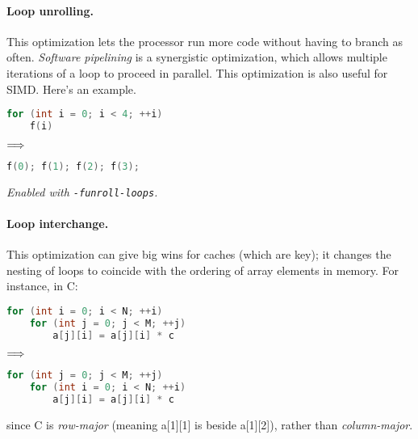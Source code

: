 \paragraph{Loop unrolling.} This optimization
lets the processor run more code without having to branch
as often. \emph{Software pipelining} is a synergistic optimization,
which allows multiple iterations of a loop to proceed in parallel.
This optimization is also useful for SIMD. Here's an example.
\begin{center}
\vspace*{-1em}
\begin{minipage}{.3\textwidth}
  \begin{lstlisting}[language=C]
for (int i = 0; i < 4; ++i)
    f(i)
  \end{lstlisting}
  \end{minipage} $\Longrightarrow \hspace*{2em}$ \begin{minipage}{.4\textwidth}
  \begin{lstlisting}[language=C]
f(0); f(1); f(2); f(3);
  \end{lstlisting}
  \end{minipage}
  \end{center}
\noindent \emph{Enabled with {\tt -funroll-loops}.}

\paragraph{Loop interchange.} This optimization can give big wins
for caches (which are key); it changes the nesting of loops to
coincide with the ordering of array elements in memory. For instance,
in C:
\begin{center}
\vspace*{-1em}
\begin{minipage}{.3\textwidth}
  \begin{lstlisting}[language=C]
for (int i = 0; i < N; ++i)
    for (int j = 0; j < M; ++j)
        a[j][i] = a[j][i] * c
  \end{lstlisting}
  \end{minipage} $\Longrightarrow \hspace*{2em}$ \begin{minipage}{.4\textwidth}
  \begin{lstlisting}[language=C]
for (int j = 0; j < M; ++j)
    for (int i = 0; i < N; ++i)
        a[j][i] = a[j][i] * c
  \end{lstlisting}
  \end{minipage}
  \end{center}
  since C is \emph{row-major} (meaning a[1][1] is beside a[1][2]),
rather than \emph{column-major}.

